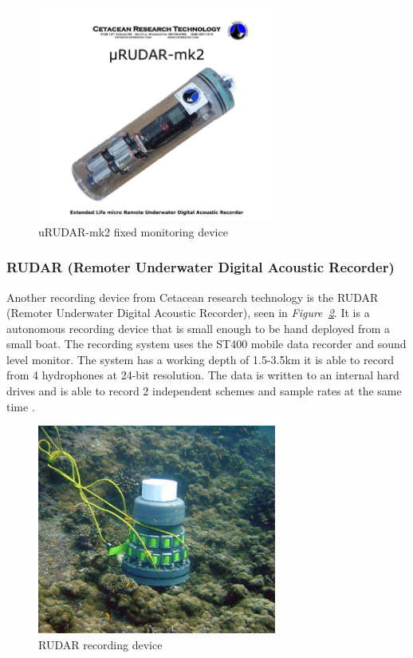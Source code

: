 \begin{figure}[h]
    \centering
    \includegraphics[width=0.70\textwidth]{graphics/uRUDAR-mk2.jpg}
    \caption{uRUDAR-mk2 fixed monitoring device\cite{computing_microrudar_nodate}}
    \label{fig:uRUDAR}
\end{figure}

\subsubsection{RUDAR (Remoter Underwater Digital Acoustic Recorder)}
Another recording device from Cetacean research technology is the RUDAR (Remoter Underwater Digital Acoustic Recorder), seen in \textit{Figure~\ref{fig:Rudar}}. 
It is a autonomous recording device that is small enough to be hand deployed from a small boat.
The recording system uses the ST400 mobile data recorder and sound level monitor. 
The system has a working depth of 1.5-3.5km it is able to record from 4 hydrophones at 24-bit resolution.
The data is written to an internal hard drives and is able to record 2 independent schemes and sample rates at the same time \cite{cetacean_research_technology_rudar_2021}.

\begin{figure}[h]
    \centering
    \includegraphics[width=0.70\textwidth]{graphics/Rudar.jpg}
    \caption{RUDAR recording device \cite{cetacean_research_technology_rudar_2021}}
    \label{fig:Rudar}
\end{figure}

